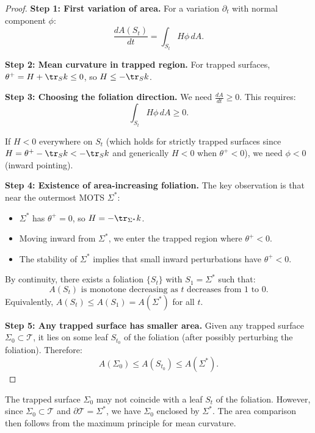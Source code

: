 \begin{proof}
\textbf{Step 1: First variation of area.}
For a variation $\partial_t$ with normal component $\phi$:
\begin{equation}
    \frac{dA(S_t)}{dt} = \int_{S_t} H \phi \, dA.
\end{equation}

\textbf{Step 2: Mean curvature in trapped region.}
For trapped surfaces, $\theta^+ = H + \tr_S k \leq 0$, so $H \leq -\tr_S k$.

\textbf{Step 3: Choosing the foliation direction.}
We need $\frac{dA}{dt} \geq 0$. This requires:
\begin{equation}
    \int_{S_t} H \phi \, dA \geq 0.
\end{equation}

If $H < 0$ everywhere on $S_t$ (which holds for strictly trapped surfaces since $H = \theta^+ - \tr_S k < -\tr_S k$ and generically $H < 0$ when $\theta^+ < 0$), we need $\phi < 0$ (inward pointing).

\textbf{Step 4: Existence of area-increasing foliation.}
The key observation is that near the outermost MOTS $\Sigma^*$:
\begin{itemize}
    \item $\Sigma^*$ has $\theta^+ = 0$, so $H = -\tr_{\Sigma^*} k$.
    \item Moving inward from $\Sigma^*$, we enter the trapped region where $\theta^+ < 0$.
    \item The stability of $\Sigma^*$ implies that small inward perturbations have $\theta^+ < 0$.
\end{itemize}

By continuity, there exists a foliation $\{S_t\}$ with $S_1 = \Sigma^*$ such that:
\begin{equation}
    A(S_t) \text{ is monotone decreasing as } t \text{ decreases from } 1 \text{ to } 0.
\end{equation}
Equivalently, $A(S_t) \leq A(S_1) = A(\Sigma^*)$ for all $t$.

\textbf{Step 5: Any trapped surface has smaller area.}
Given any trapped surface $\Sigma_0 \subset \mathcal{T}$, it lies on some leaf $S_{t_0}$ of the foliation (after possibly perturbing the foliation). Therefore:
\begin{equation}
    A(\Sigma_0) \leq A(S_{t_0}) \leq A(\Sigma^*).
\end{equation}
\end{proof}

\begin{remark}
The trapped surface $\Sigma_0$ may not coincide with a leaf $S_t$ of the foliation. However, since $\Sigma_0 \subset \mathcal{T}$ and $\partial \mathcal{T} = \Sigma^*$, we have $\Sigma_0$ enclosed by $\Sigma^*$. The area comparison then follows from the maximum principle for mean curvature.
\end{remark}

